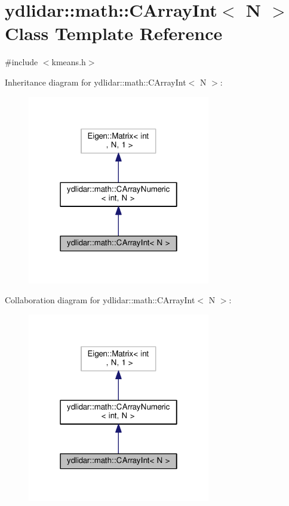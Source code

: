 \hypertarget{classydlidar_1_1math_1_1_c_array_int}{}\section{ydlidar\+:\+:math\+:\+:C\+Array\+Int$<$ N $>$ Class Template Reference}
\label{classydlidar_1_1math_1_1_c_array_int}


{\ttfamily \#include $<$kmeans.\+h$>$}



Inheritance diagram for ydlidar\+:\+:math\+:\+:C\+Array\+Int$<$ N $>$\+:\nopagebreak
\begin{figure}[H]
\begin{center}
\leavevmode
\includegraphics[width=226pt]{classydlidar_1_1math_1_1_c_array_int__inherit__graph}
\end{center}
\end{figure}


Collaboration diagram for ydlidar\+:\+:math\+:\+:C\+Array\+Int$<$ N $>$\+:\nopagebreak
\begin{figure}[H]
\begin{center}
\leavevmode
\includegraphics[width=226pt]{classydlidar_1_1math_1_1_c_array_int__coll__graph}
\end{center}
\end{figure}
